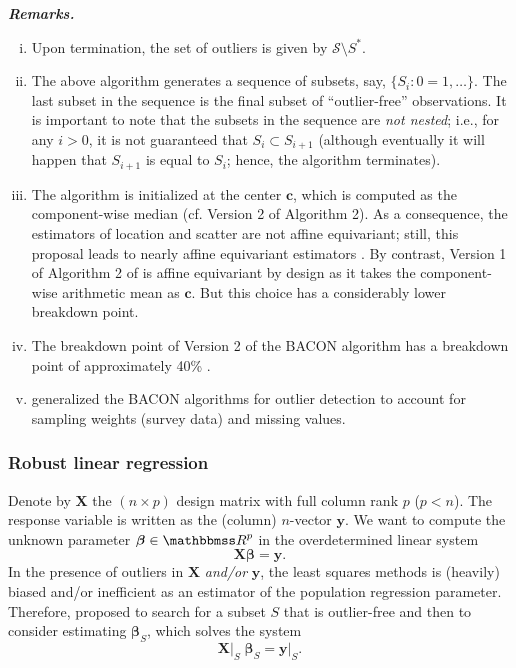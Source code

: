\documentclass[a4paper,oneside,11pt,DIV=12]{scrartcl}
\newcommand{\R}{{\mathbbmss R}} %
\begin{document}
\vspace{1em}
\noindent\textbf{\sffamily \small \itshape Remarks.}
\vspace{-0.5em}
\begin{enumerate}[i)]
	\item Upon termination, the set of outliers is given by $\mathscr{S} \setminus S^*$.
	\item The above algorithm generates a sequence of subsets, say, $\{S_i : 0=1, \ldots\}$. The last subset in the sequence is the final subset of ``outlier-free'' observations. It is important to note that the subsets in the sequence are \textit{not  nested}; i.e., for any $i>0$, it is not guaranteed that $S_i \subset S_{i+1}$ (although eventually it will happen that $S_{i+1}$ is equal to $S_i$; hence, the algorithm terminates). 
	\item The algorithm is initialized at the center $\bm c$, which is computed as the component-wise median (cf. Version 2 of Algorithm 2). As a consequence, the estimators of location and scatter are not affine equivariant; still, this proposal leads to nearly affine equivariant estimators \citep{billor_hadi_etal_2000}. By contrast, Version 1 of Algorithm 2 of \citet{billor_hadi_etal_2000} is affine equivariant by design as it takes the component-wise arithmetic mean as $\bm c$. But this choice has a considerably lower breakdown point.    
	\item The breakdown point of Version 2 of the BACON algorithm has a breakdown point of approximately 40\% \citep{billor_hadi_etal_2000}.
	\item \citet{beguin_hulliger_2008} generalized the BACON algorithms for outlier detection to account for sampling weights (survey data) and missing values. 
\end{enumerate}

\subsubsection{Robust linear regression} 
Denote by $\bm X$ the $(n \times p)$ design matrix with full column rank $p$ ($p < n$). The response variable is written as the (column) $n$-vector $\bm y$. We want to compute the unknown parameter $\bm \beta \in \R^p$ in the overdetermined linear system 
\begin{equation*}
	\bm X \bm \beta = \bm y. 
\end{equation*}
\noindent In the presence of outliers in $\bm X$ \textit{and/or} $\bm y$, the least squares methods is (heavily) biased and/or inefficient as an estimator of the population regression parameter. Therefore, \citet{billor_hadi_etal_2000} proposed to search for a subset $S$ that is outlier-free and then to consider estimating $\bm \beta_S$, which solves the system 
\begin{equation}\label{eq:linsystem0}
	\bm X \vert_{S} \; \bm \beta_S = \bm y \vert_{S}. 
\end{equation}
\end{document}
